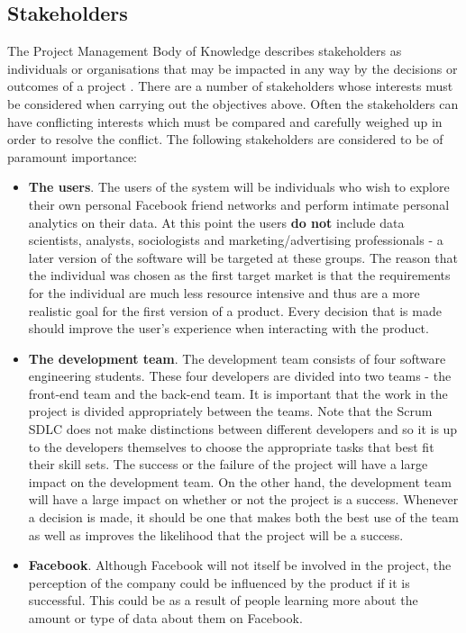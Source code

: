 \documentclass[12pt,onecolumn]{article}
\begin{document}
	\subsection{Stakeholders} %
	
	The Project Management Body of Knowledge describes stakeholders as individuals or organisations that may be impacted in any way by the decisions or outcomes of a project \cite{pmbok}. There are a number of stakeholders whose interests must be considered when carrying out the objectives above. Often the stakeholders can have conflicting interests which must be compared and carefully weighed up in order to resolve the conflict. The following stakeholders are considered to be of paramount importance:
	
	\begin{itemize}
		\item \textbf{The users}. The users of the system will be individuals who wish to explore their own personal Facebook friend networks and perform intimate personal analytics on their data. At this point the users \textbf{do not} include data scientists, analysts, sociologists and marketing/advertising professionals - a later version of the software will be targeted at these groups. The reason that the individual was chosen as the first target market is that the requirements for the individual are much less resource intensive and thus are a more realistic goal for the first version of a product. Every decision that is made should improve the user's experience when interacting with the product. 
		
		\item \textbf{The development team}. The development team consists of four software engineering students. These four developers are divided into two teams - the front-end team and the back-end team. It is important that the work in the project is divided appropriately between the teams. Note that the Scrum SDLC does not make distinctions between different developers and so it is up to the developers themselves to choose the appropriate tasks that best fit their skill sets. The success or the failure of the project will have a large impact on the development team. On the other hand, the development team will have a large impact on whether or not the project is a success. Whenever a decision is made, it should be one that makes both the best use of the team as well as improves the likelihood that the project will be a success.
		
		\item \textbf{Facebook}. Although Facebook will not itself be involved in the project, the perception of the company could be influenced by the product if it is successful. This could be as a result of people learning more about the amount or type of data about them on Facebook.
		
	\end{itemize}
	
\end{document}
